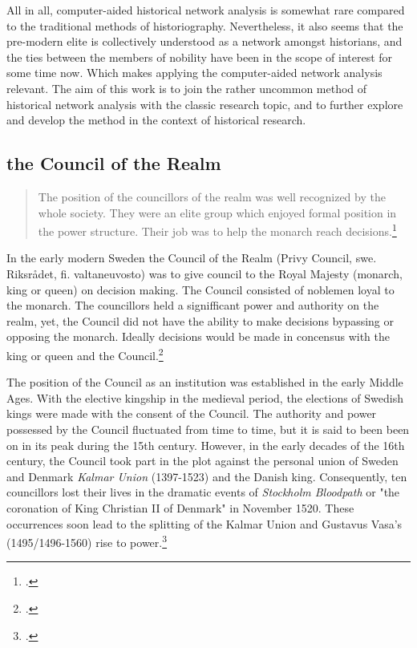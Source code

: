 All in all, computer-aided historical network analysis is somewhat rare compared to the traditional methods of historiography. Nevertheless, it also seems that the pre-modern elite is collectively understood as a network amongst historians, and the ties between the members of nobility have been in the scope of interest for some time now. Which makes applying the computer-aided network analysis relevant. The aim of this work is to join the rather uncommon method of historical network analysis with the classic research topic, and to further explore and develop the method in the context of historical research.

\subsection{the Council of the Realm}
\label{councilofrealm}
\begin{quote}
	The position of the councillors of the realm was well recognized by the whole society. They were an elite group which enjoyed formal position in the power structure. Their job was to help the monarch reach decisions.\footcite[p. 26.]{agencyAndStateBuilding}
\end{quote}

In the early modern Sweden the Council of the Realm (Privy Council, swe. Riksrådet, fi. valtaneuvosto) was to give council to the Royal Majesty (monarch, king or queen) on decision making. The Council consisted of noblemen loyal to the monarch. The councillors held a signifficant power and authority on the realm, yet, the Council did not have the ability to make decisions bypassing or opposing the monarch. Ideally decisions would be made in concensus with the king or queen and the Council.\footcites[p. 13-14,]{hopesAndFearsIntro}[p. 47-50.]{HakanenAKoskinen2017}

The position of the Council as an institution was established in the early Middle Ages. With the elective kingship in the medieval period, the elections of Swedish kings were made with the consent of the Council. The authority and power possessed by the Council fluctuated from time to time, but it is said to been been on in its peak during the 15th century. However, in the early decades of the 16th century, the Council took part in the plot against the personal union of Sweden and Denmark \textit{Kalmar Union} (1397-1523) and the Danish king. Consequently, ten councillors lost their lives in the dramatic events of \textit{Stockholm Bloodpath} or "the coronation of King Christian II of Denmark" in November 1520. These occurrences soon lead to the splitting of the Kalmar Union and Gustavus Vasa's (1495/1496-1560) rise to power.\footcites[p. 49-50,]{HakanenAKoskinen2017}[p. 8-9.]{personalAgency}

